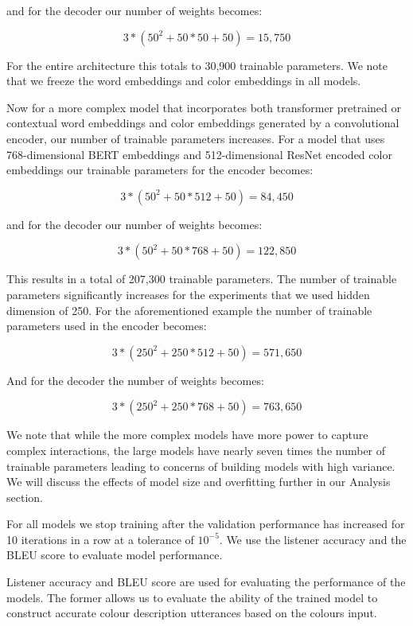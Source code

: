 \par
and for the decoder our number of weights becomes:

\[3*(50^2 + 50*50 +50) = 15,750\]

\par
For the entire architecture this totals to 30,900 trainable parameters. We note that we freeze the word embeddings and color embeddings in all models.

\par
Now for a more complex model that incorporates both transformer pretrained or contextual word embeddings and color embeddings generated by a convolutional encoder, our number of trainable parameters increases. For a model that uses 768-dimensional BERT embeddings and 512-dimensional ResNet encoded color embeddings our trainable parameters for the encoder becomes:

\[3*(50^2 + 50*512 +50) = 84,450\]

\par
and for the decoder our number of weights becomes:

\[3*(50^2 + 50*768 +50) = 122,850\]

\par
This results in a total of 207,300 trainable parameters. The number of trainable parameters significantly increases for the experiments that we used hidden dimension of 250. For the aforementioned example the number of trainable parameters used in the encoder becomes:

\[3*(250^2 + 250*512 +50) = 571,650\]

\par
And for the decoder the number of weights becomes:

\[3*(250^2 + 250*768 +50) = 763,650\]

\par
We note that while the more complex models have more power to capture complex interactions, the large models have nearly seven times the number of trainable parameters leading to concerns of building models with high variance. We will discuss the effects of model size and overfitting further in our Analysis section.

\par
For all models we stop training after the validation performance has increased for 10 iterations in a row at a tolerance of \(10^{-5}\). We use the listener accuracy and the BLEU score to evaluate model performance.

\par
Listener accuracy and BLEU score are used for evaluating the performance of the models. The former allows us to evaluate the ability of the trained model to construct accurate colour description utterances based on the colours input.

